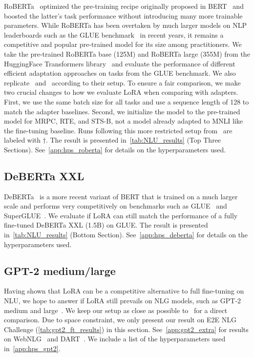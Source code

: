 RoBERTa~\citep{liu2019roberta} optimized the pre-training recipe originally proposed in BERT~\citep{devlin2019bert} and boosted the latter's task performance without introducing many more trainable parameters. While RoBERTa has been overtaken by much larger models on NLP leaderboards such as the GLUE benchmark~\citep{wang2019glue} in recent years, it remains a competitive and popular pre-trained model for its size among practitioners. We take the pre-trained RoBERTa base (125M) and RoBERTa large (355M) from the HuggingFace Transformers library~\citep{wolf-etal-2020-transformers} and evaluate the performance of different efficient adaptation approaches on tasks from the GLUE benchmark. We also replicate~\cite{houlsby_parameter-efficient_2019} and~\cite{pfeiffer2021adapterfusion} according to their setup. To ensure a fair comparison, we make two crucial changes to how we evaluate LoRA when comparing with adapters. First, we use the same batch size for all tasks and use a sequence length of 128 to match the adapter baselines. Second, we initialize the model to the pre-trained model for MRPC, RTE, and STS-B, not a model already adapted to MNLI like the fine-tuning baseline. Runs following this more restricted setup from~\cite{houlsby_parameter-efficient_2019} are labeled with $\dagger$.
The result is presented in~\autoref{tab:NLU_results} (Top Three Sections).
See~\autoref{app:hps_roberta} for details on the hyperparameters used.

\subsection{DeBERTa XXL}
\label{sec:deberta_expt}
DeBERTa~\citep{he2021deberta} is a more recent variant of BERT that is trained on a much larger scale and performs very competitively on benchmarks such as GLUE~\citep{wang2019glue} and SuperGLUE~\citep{wang2020superglue}. We evaluate if LoRA can still match the performance of a fully fine-tuned DeBERTa XXL (1.5B) on GLUE. The result is presented in~\autoref{tab:NLU_results} (Bottom Section).
See~\autoref{app:hps_deberta} for details on the hyperparameters used.

\subsection{GPT-2 medium/large}
\label{sec:gpt2_expt}
Having shown that LoRA can be a competitive alternative to full fine-tuning on NLU, we hope to answer if LoRA still prevails on NLG models, such as GPT-2 medium and large~\citep{radford_language_nodate}. We keep our setup as close as possible to~\cite{li_prefix-tuning_2021} for a direct comparison. Due to space constraint, we only present our result on E2E NLG Challenge (\autoref{tab:gpt2_ft_results}) in this section.
See~\autoref{app:gpt2_extra} for results on WebNLG~\citep{gardent2017webnlg} and DART~\citep{nan2020dart}. We include a list of the hyperparameters used in~\autoref{app:hps_gpt2}.

